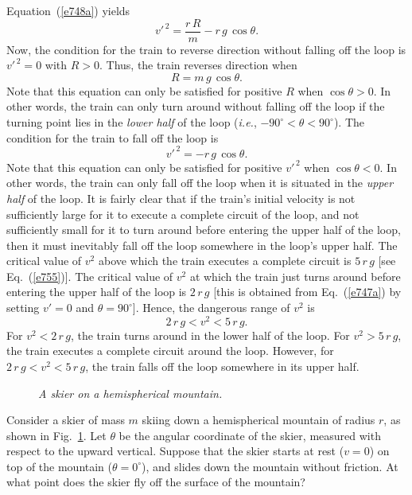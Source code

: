 Equation~(\ref{e748a}) yields
\begin{equation}
{v'}^{\,2} = \frac{r\,R}{m} - r\,g\,\cos\theta.
\end{equation}
Now, the condition for the train to reverse direction without falling off the loop
is ${v'}^{\,2}=0$ with $R>0$. Thus, the train reverses direction when
\begin{equation}
R=   m\,g\,\cos\theta.
\end{equation}
Note that this equation can only be satisfied for positive $R$ when $\cos\theta>0$.
In other words, the train can only turn around without falling off the loop
if the turning point lies in the {\em lower half} of the loop ({\em i.e.},
$-90^\circ<\theta<90^\circ$).
The condition for the train to fall off the loop is
\begin{equation}
{v'}^{\,2} =- r\,g\,\cos\theta.
\end{equation}
Note that this equation can only be satisfied for positive ${v'}^{\,2}$ when $\cos\theta<0$.
In other words, the train can only fall off the loop when it is situated in the {\em upper half} of the
loop. It is fairly clear that if the train's initial velocity is not sufficiently large for
it to execute a complete circuit of the loop, and not sufficiently small for it to turn around before
entering the upper half of the loop, then it must inevitably fall off the loop somewhere in the
loop's upper half. The critical value of $v^2$ above which the train
executes a complete circuit is $5\,r\,g$ [see Eq.~(\ref{e755})]. The critical value of $v^2$ at which the train just
turns around before entering the upper half of the loop is $2\,r\,g$ [this is obtained
from Eq.~(\ref{e747a}) by setting $v'=0$ and $\theta=90^\circ$]. Hence, the
dangerous range of $v^2$ is
\begin{equation}
2\,r\,g < v^2< 5\,r\,g.
\end{equation}
For $v^2<2\,r\,g$, the train turns around in the lower half of the loop.
For $v^2 >  5\,r\,g$, the train executes a complete circuit around the loop. However, for
$2\,r\,g < v^2< 5\,r\,g$, the train falls off the loop somewhere in its upper half.

\begin{figure}
\epsfysize=1.75in
\centerline{}
\caption{\em A skier on a hemispherical mountain.}\label{f67}  
\end{figure}

Consider a skier of mass $m$ skiing down a hemispherical mountain of radius $r$, as
shown in Fig.~\ref{f67}. Let $\theta$ be the angular coordinate of the skier, measured
with respect to the upward vertical. Suppose that the skier starts at rest ($v=0$) on top
of the mountain ($\theta=0^\circ$), and slides down the mountain without friction.
At what point does the skier fly off the surface of the mountain?

